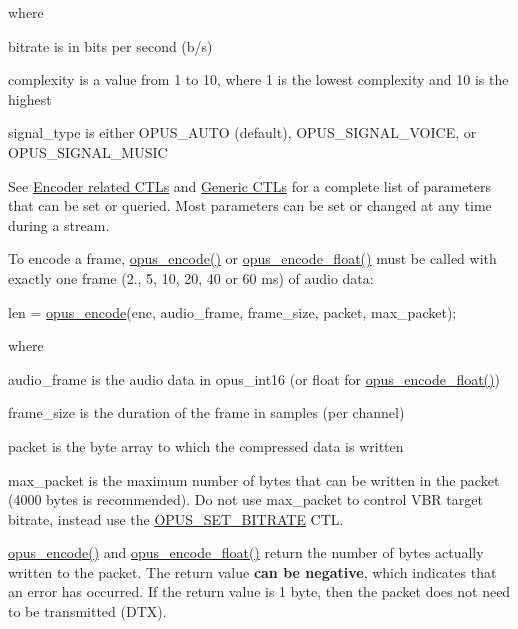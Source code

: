 where

\begin{DoxyItemize}
\item bitrate is in bits per second (b/s) \item complexity is a value from 1 to 10, where 1 is the lowest complexity and 10 is the highest \item signal\+\_\+type is either O\+P\+U\+S\+\_\+\+A\+U\+TO (default), O\+P\+U\+S\+\_\+\+S\+I\+G\+N\+A\+L\+\_\+\+V\+O\+I\+CE, or O\+P\+U\+S\+\_\+\+S\+I\+G\+N\+A\+L\+\_\+\+M\+U\+S\+IC\end{DoxyItemize}
See \hyperlink{group__opus__encoderctls}{Encoder related C\+T\+Ls} and \hyperlink{group__opus__genericctls}{Generic C\+T\+Ls} for a complete list of parameters that can be set or queried. Most parameters can be set or changed at any time during a stream.

To encode a frame, \hyperlink{group__opus__encoder_gad2d6bf6a9ffb6674879d7605ed073e25}{opus\+\_\+encode()} or \hyperlink{group__opus__encoder_ga4ae9905859cd241ef4bb5c59cd5e5309}{opus\+\_\+encode\+\_\+float()} must be called with exactly one frame (2., 5, 10, 20, 40 or 60 ms) of audio data\+: 
\begin{DoxyCode}
len = \hyperlink{group__opus__encoder_gad2d6bf6a9ffb6674879d7605ed073e25}{opus\_encode}(enc, audio\_frame, frame\_size, packet, max\_packet);
\end{DoxyCode}


where 
\begin{DoxyItemize}
\item audio\+\_\+frame is the audio data in opus\+\_\+int16 (or float for \hyperlink{group__opus__encoder_ga4ae9905859cd241ef4bb5c59cd5e5309}{opus\+\_\+encode\+\_\+float()}) 
\item frame\+\_\+size is the duration of the frame in samples (per channel) 
\item packet is the byte array to which the compressed data is written 
\item max\+\_\+packet is the maximum number of bytes that can be written in the packet (4000 bytes is recommended). Do not use max\+\_\+packet to control V\+BR target bitrate, instead use the \hyperlink{group__opus__encoderctls_ga0bb51947e355b33d0cb358463b5101a7}{O\+P\+U\+S\+\_\+\+S\+E\+T\+\_\+\+B\+I\+T\+R\+A\+TE} C\+TL. 
\end{DoxyItemize}

\hyperlink{group__opus__encoder_gad2d6bf6a9ffb6674879d7605ed073e25}{opus\+\_\+encode()} and \hyperlink{group__opus__encoder_ga4ae9905859cd241ef4bb5c59cd5e5309}{opus\+\_\+encode\+\_\+float()} return the number of bytes actually written to the packet. The return value {\bfseries can be negative}, which indicates that an error has occurred. If the return value is 1 byte, then the packet does not need to be transmitted (D\+TX).

